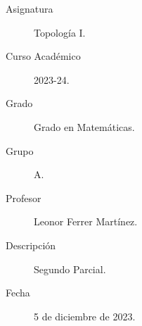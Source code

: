 \documentclass[12pt]{article}
\begin{document}

    
    

    \begin{description}
        \item[Asignatura] Topología I.
        \item[Curso Académico] 2023-24.
        \item[Grado] Grado en Matemáticas.
        \item[Grupo] A.
        \item[Profesor] Leonor Ferrer Martínez.
        \item[Descripción] Segundo Parcial.
        \item[Fecha] 5 de diciembre de 2023.
    
    \end{description}
    \newpage
    
\end{document}
